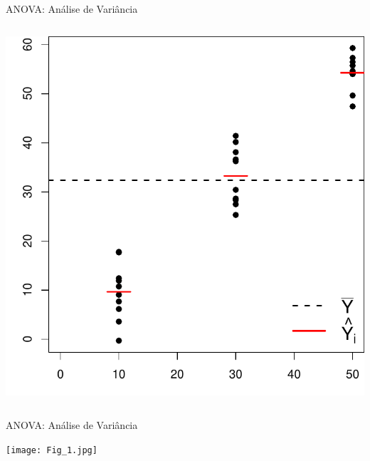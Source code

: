 \documentclass{beamer}\usepackage[]{graphicx}\usepackage[]{color}
\newenvironment{knitrout}{}{} %
\renewenvironment{knitrout}{\setlength{\topsep}{0mm}}{}
\begin{document}
\begin{frame}{ANOVA: Análise de Variância}
\begin{columns}[c]
\begin{knitrout}
\color{fgcolor}
\includegraphics[width=1\linewidth]{figure/plotanova-1} 

\end{knitrout}

\end{columns}

\end{frame}

\begin{frame}{ANOVA: Análise de Variância}

\texttt{[image: Fig\_1.jpg]}

\end{frame}
\end{document}
